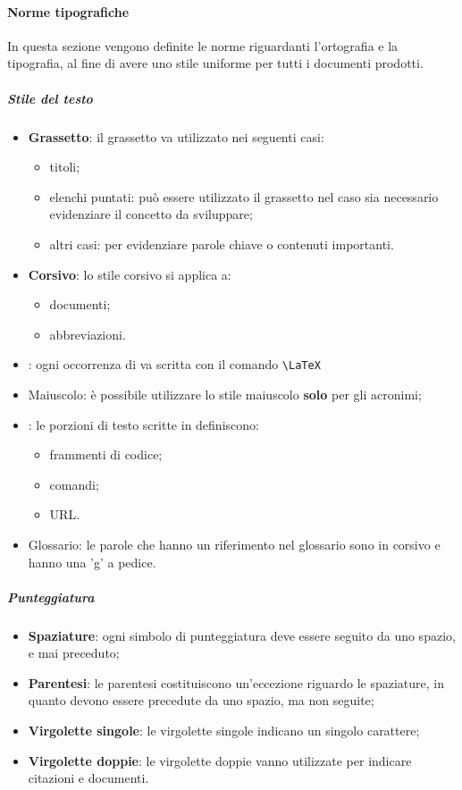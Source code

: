 	\paragraph{Norme tipografiche}
	\label{sec:3.1.2.2}
		In questa sezione vengono definite le norme riguardanti l'ortografia e la tipografia, al fine di avere uno stile uniforme per tutti i documenti prodotti.
		\subparagraph{Stile del testo}
		\label{sec:3.1.2.2.1}
			\begin{itemize}
				\item \textbf{Grassetto}: il grassetto va utilizzato nei seguenti casi:
				\begin{itemize}
					\item titoli;
					\item elenchi puntati: può essere utilizzato il grassetto nel caso sia necessario evidenziare il concetto da sviluppare;
					\item altri casi: per evidenziare parole chiave o contenuti importanti.
				\end{itemize}
				\item \textbf{Corsivo}: lo stile corsivo si applica a:
				\begin{itemize}
					\item documenti;
					\item abbreviazioni.
				\end{itemize}
				\item \gl{\LaTeX}: ogni occorrenza di \gl{\LaTeX}{} va scritta con il comando \texttt{\textbackslash LaTeX}
				\item Maiuscolo: è possibile utilizzare lo stile maiuscolo \textbf{solo} per gli acronimi;
				\item {}: le porzioni di testo scritte in  definiscono:
				\begin{itemize}
					\item frammenti di codice;
					\item comandi;
					\item URL.
				\end{itemize} 
				\item Glossario: le parole che hanno un riferimento nel glossario sono in corsivo e hanno una 'g' a pedice.
			\end{itemize}
		\subparagraph{Punteggiatura}
		\label{sec:3.1.2.2.2}
			\begin{itemize}
				\item \textbf{Spaziature}: ogni simbolo di punteggiatura deve essere seguito da uno spazio, e mai preceduto;
				\item \textbf{Parentesi}: le parentesi costituiscono un'eccezione riguardo le spaziature, in quanto devono essere precedute da uno spazio, ma non seguite;
				\item \textbf{Virgolette singole}: le virgolette singole indicano un singolo carattere;
				\item \textbf{Virgolette doppie}: le virgolette doppie vanno utilizzate per indicare citazioni e documenti.
			\end{itemize}
